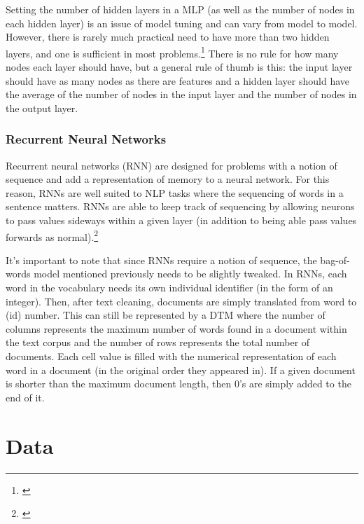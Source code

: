 \documentclass[12pt]{article}
\begin{document}
Setting the number of hidden layers in a MLP (as well as the number of
nodes in each hidden layer) is an issue of model tuning and can vary
from model to model. However, there is rarely much practical need to
have more than two hidden layers, and one is sufficient in most
problems.\footnote{\citet{ModelSelectionHow}} There is no rule for how
many nodes each layer should have, but a general rule of thumb is this:
the input layer should have as many nodes as there are features and a
hidden layer should have the average of the number of nodes in the input
layer and the number of nodes in the output layer.

\hypertarget{recurrent-neural-networks}{%
\subsubsection{Recurrent Neural
Networks}\label{recurrent-neural-networks}}

Recurrent neural networks (RNN) are designed for problems with a notion
of sequence and add a representation of memory to a neural network. For
this reason, RNNs are well suited to NLP tasks where the sequencing of
words in a sentence matters. RNNs are able to keep track of sequencing
by allowing neurons to pass values sideways within a given layer (in
addition to being able pass values forwards as normal).\footnote{\citet{brownleeCrashCourseRecurrent2016}}

It's important to note that since RNNs require a notion of sequence, the
bag-of-words model mentioned previously needs to be slightly tweaked. In
RNNs, each word in the vocabulary needs its own individual identifier
(in the form of an integer). Then, after text cleaning, documents are
simply translated from word to (id) number. This can still be
represented by a DTM where the number of columns represents the maximum
number of words found in a document within the text corpus and the
number of rows represents the total number of documents. Each cell value
is filled with the numerical representation of each word in a document
(in the original order they appeared in). If a given document is shorter
than the maximum document length, then 0's are simply added to the end
of it.

\newpage

\hypertarget{data}{%
\section{Data}\label{data}}

\label{sec:data}
\end{document}
